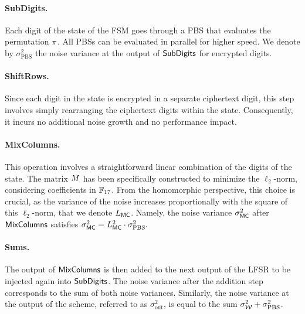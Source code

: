\paragraph{SubDigits.} Each digit of the state of the FSM goes through a PBS that evaluates the permutation $\pi$. All PBSs can be evaluated in parallel for higher speed. We denote by $\sigma_{\text{PBS}}^2$ the noise variance at the output of $\text{\textsf{SubDigits}}$ for encrypted digits.


\paragraph{ShiftRows.} Since each digit in the state is encrypted in a separate ciphertext digit, this step involves simply rearranging the ciphertext digits within the state. Consequently, it incurs no additional noise growth and no performance impact.

\paragraph{MixColumns.} This operation involves a straightforward linear combination of the digits of the state. The matrix $M$ has been specifically constructed to minimize the $\ell_2$-norm, considering coefficients in $\mathbb{F}_{17}$. %
From the homomorphic perspective, this choice is crucial, as the variance of the noise increases proportionally with the square of this $\ell_2$-norm, that we denote $L_{\text{\textsf{MC}}}$. Namely, the noise variance $\sigma^2_{\text{\textsf{MC}}}$ after  $\text{\textsf{MixColumns}}$ satisfies $\sigma^2_{\text{\textsf{MC}}} = L_{\text{\textsf{MC}} }^2 \cdot \sigma_{\text{PBS}}^2.$


\paragraph{Sums.} The output of $\text{\textsf{MixColumns}}$ is then added to the next output of the LFSR to be injected again into $\text{\textsf{SubDigits}}$. The noise variance after the addition step corresponds to the sum of both noise variances. Similarly, the noise variance at the output of the scheme, referred to as $\sigma^2_{\text{out}}$, is equal to the sum $\sigma_{\mathcal{W}}^2 + \sigma_{\text{PBS}}^2$.






